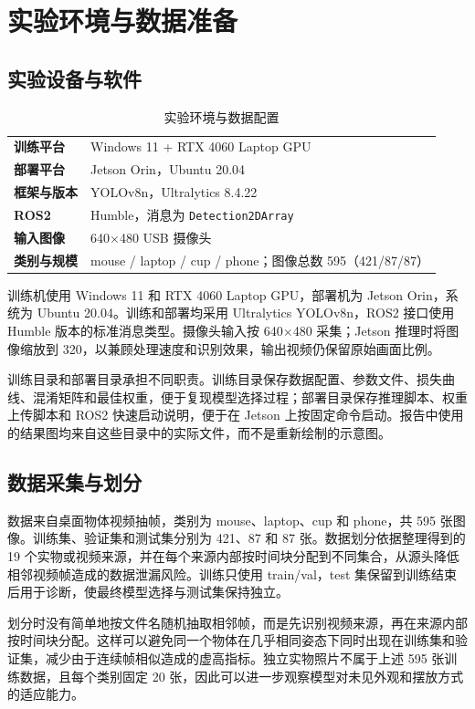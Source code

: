 \documentclass[11pt,conference,a4paper]{IEEEtran}
\newcommand{\code}[1]{\texttt{\footnotesize #1}}
\begin{document}
\FloatBarrier
\section{实验环境与数据准备}
\subsection{实验设备与软件}
\begin{table}[H]
\centering
\scriptsize
\caption{实验环境与数据配置}
\begin{tabularx}{\columnwidth}{>{\bfseries}p{} X}
\toprule
训练平台 & Windows 11 + RTX 4060 Laptop GPU\\
部署平台 & Jetson Orin，Ubuntu 20.04\\
框架与版本 & YOLOv8n，Ultralytics 8.4.22\\
ROS2 & Humble，消息为 \code{Detection2DArray}\\
输入图像 & 640$\times$480 USB 摄像头\\
类别与规模 & mouse / laptop / cup / phone；图像总数 595（421/87/87）\\
\bottomrule
\end{tabularx}
\end{table}

训练机使用 Windows 11 和 RTX 4060 Laptop GPU，部署机为 Jetson Orin，系统为 Ubuntu 20.04。训练和部署均采用 Ultralytics YOLOv8n，ROS2 接口使用 Humble 版本的标准消息类型。摄像头输入按 640$\times$480 采集；Jetson 推理时将图像缩放到 320，以兼顾处理速度和识别效果，输出视频仍保留原始画面比例。

训练目录和部署目录承担不同职责。训练目录保存数据配置、参数文件、损失曲线、混淆矩阵和最佳权重，便于复现模型选择过程；部署目录保存推理脚本、权重上传脚本和 ROS2 快速启动说明，便于在 Jetson 上按固定命令启动。报告中使用的结果图均来自这些目录中的实际文件，而不是重新绘制的示意图。

\subsection{数据采集与划分}
数据来自桌面物体视频抽帧，类别为 mouse、laptop、cup 和 phone，共 595 张图像。训练集、验证集和测试集分别为 421、87 和 87 张。数据划分依据整理得到的 19 个实物或视频来源，并在每个来源内部按时间块分配到不同集合，从源头降低相邻视频帧造成的数据泄漏风险。训练只使用 train/val，test 集保留到训练结束后用于诊断，使最终模型选择与测试集保持独立。

划分时没有简单地按文件名随机抽取相邻帧，而是先识别视频来源，再在来源内部按时间块分配。这样可以避免同一个物体在几乎相同姿态下同时出现在训练集和验证集，减少由于连续帧相似造成的虚高指标。独立实物照片不属于上述 595 张训练数据，且每个类别固定 20 张，因此可以进一步观察模型对未见外观和摆放方式的适应能力。
\end{document}
